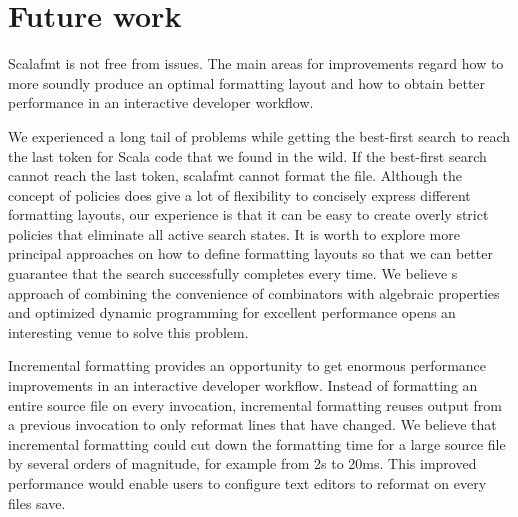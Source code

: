 \section{Future work}
Scalafmt is not free from issues.
The main areas for improvements regard how to more soundly produce an optimal formatting layout and how to obtain better performance in an interactive developer workflow.

We experienced a long tail of problems while getting the best-first search to reach the last token for Scala code that we found in the wild.
If the best-first search cannot reach the last token, scalafmt cannot format the file.
Although the concept of policies does give a lot of flexibility to concisely express different formatting layouts, our experience is that it can be easy to create overly strict policies that eliminate all active search states.
It is worth to explore more principal approaches on how to define formatting layouts so that we can better guarantee that the search successfully completes every time.
We believe \rfmt{}s approach of combining the convenience of combinators with algebraic properties and optimized dynamic programming for excellent performance opens an interesting venue to solve this problem.

Incremental formatting provides an opportunity to get enormous performance improvements in an interactive developer workflow.
Instead of formatting an entire source file on every invocation, incremental formatting reuses output from a previous invocation to only reformat lines that have changed.
We believe that incremental formatting could cut down the formatting time for a large source file by several orders of magnitude, for example from 2s to 20ms.
This improved performance would enable users to configure text editors to reformat on every files save.

